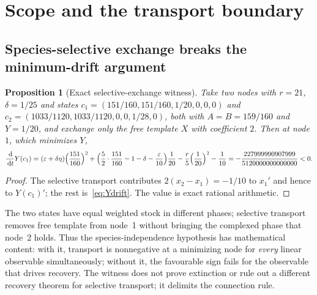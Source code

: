 \documentclass[11pt,a4paper]{article}
\theoremstyle{plain}
\newtheorem{proposition}[theorem]{Proposition}
\theoremstyle{definition}
\theoremstyle{remark}
\newcommand{\eps}{\varepsilon}
\newcommand{\dd}{\,\mathrm d}
\begin{document}
\section{Scope and the transport boundary}\label{sec:scope}

\subsection{Species-selective exchange breaks the minimum-drift argument}
\begin{proposition}[Exact selective-exchange witness]\label{prop:selective}
Take two nodes with $r=21$, $\delta=1/25$ and states $c_1=(151/160,151/160,1/20,0,0,0)$ and $c_2=(1033/1120,1033/1120,0,0,1/28,0)$, both with $A=B=159/160$ and $Y=1/20$, and exchange only the free template $X$ with coefficient $2$. Then at node $1$, which minimizes $Y$,
\begin{equation}\label{eq:witness}
\frac{\dd}{\dd t}Y(c_1)=(\eps+\delta\eta)\Bigl(\frac{151}{160}\Bigr)^2+\Bigl(\frac52\cdot\frac{151}{160}-1-\delta-\frac{\eps}{10}\Bigr)\frac1{20}-\frac r5\Bigl(\frac1{20}\Bigr)^2-\frac1{10}
=-\frac{227999990907999}{5120000000000000}<0 .
\end{equation}
\end{proposition}
\begin{proof}
The selective transport contributes $2(x_2-x_1)=-1/10$ to $x_1'$ and hence to $Y(c_1)'$; the rest is~\eqref{eq:Ydrift}. The value is exact rational arithmetic.
\end{proof}
The two states have equal weighted stock in different phases; selective transport removes free template from node~1 without bringing the complexed phase that node~2 holds. Thus the species-independence hypothesis has mathematical content: with it, transport is nonnegative at a minimizing node for \emph{every} linear observable simultaneously; without it, the favourable sign fails for the observable that drives recovery. The witness does not prove extinction or rule out a different recovery theorem for selective transport; it delimits the connection rule.
\end{document}
